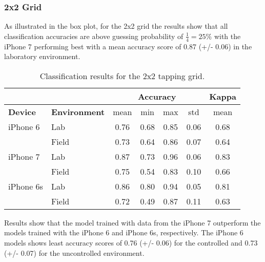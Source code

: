 \subsubsection{2x2 Grid}
As illustrated in the box plot, for the 2x2 grid the results show that all classification accuracies are above guessing probability of $\frac{1}{4} = 25\%$ with the iPhone 7 performing best with a mean accuracy score of 0.87 (+/- 0.06) in the laboratory environment.

\begin{table}[h!]
  \centering
\begin{tabular}{|l|l|c|c|c|c|c|}
  \cline{3-7}
  \multicolumn{2}{c}{} & \multicolumn{4}{|c|}{\textbf{Accuracy}} & \textbf{Kappa} \\
  \hline
  \textbf{Device} & \textbf{Environment} & mean &   min &   max  & std &  mean \\
  \hline
  iPhone 6 & Lab &      0.76 &     0.68 &     0.85 &     0.06 &        0.68 \\
  & Field &      0.73 &     0.64 &     0.86 &     0.07 &        0.64 \\
  \hline
iPhone 7 & Lab &      0.87 &     0.73 &     0.96 &     0.06 &        0.83 \\
  & Field &      0.75 &     0.54 &     0.83 &     0.10 &        0.66 \\
  \hline
iPhone 6s & Lab &      0.86 &     0.80 &     0.94 &     0.05 &        0.81 \\
  & Field &      0.72 &     0.49 &     0.87 &     0.11 &        0.63 \\
  \hline
\end{tabular}
  \caption{Classification results for the 2x2 tapping grid.}
\end{table}

Results show that the model trained with data from the iPhone 7 outperform the models trained with the iPhone 6 and iPhone 6s, respectively. The iPhone 6 models shows least accuracy scores of 0.76 (+/- 0.06) for the controlled and 0.73 (+/- 0.07) for the uncontrolled environment.


